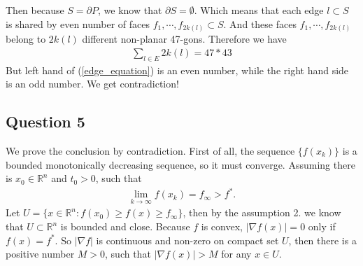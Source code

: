 \documentclass[pdf]{article}
\begin{document}
Then because $S = \partial P$, we know that $\partial S = \emptyset$. Which means that each edge $l\subset S$ is shared by even number of faces $f_1, \cdots, f_{2k(l)}\subset S$. And these faces $f_1, \cdots, f_{2k(l)}$ belong to $2k(l)$ different non-planar 47-gons. Therefore we have
\begin{align}\label{edge_equation}
\sum\limits_{l\in E}2k(l) = 47*43
\end{align}
But left hand of (\ref{edge_equation}) is an even number, while the right hand side is an odd number. We get contradiction!

\newpage
\subsection{Question 5}
We prove the conclusion by contradiction. First of all, the sequence $\{f(x_k)\}$ is a bounded monotonically decreasing sequence, so it must converge. Assuming there is $x_0\in \mathbb{R}^n$ and $t_0>0$, such that 
\begin{align}\label{Question5Assumption}
\lim\limits_{k\to\infty}f(x_k) = f_\infty > f^*.
\end{align}
Let $U = \{x\in\mathbb{R}^n: f(x_0)\geq f(x) \geq f_\infty\}$, then by the assumption 2. we know that $U\subset \mathbb{R}^n$ is bounded and close. Because $f$ is convex, $|\nabla f(x)|=0$ only if $f(x) = f^*$. So $|\nabla f|$ is continuous and non-zero on compact set $U$, then there is a positive number $M>0$, such that $|\nabla f(x)| > M$ for any $x\in U$.\\
\end{document}
